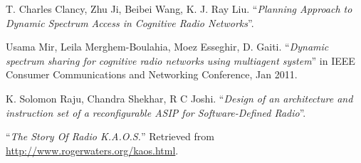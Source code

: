 \documentclass[]{scrartcl}
\begin{document}
\begin{thebibliography}{9}
T. Charles Clancy,
Zhu Ji,
Beibei Wang,
K. J. Ray Liu.
``\textit{Planning Approach to Dynamic Spectrum Access
in Cognitive Radio Networks}''.

Usama Mir,
Leila Merghem-Boulahia,
Moez Esseghir,
D. Gaiti.
``\textit{Dynamic spectrum sharing for cognitive radio networks 
using multiagent system}'' in IEEE Consumer Communications and 
Networking Conference, Jan 2011.

K. Solomon Raju, Chandra Shekhar, R C Joshi.
``\textit{Design of an architecture and instruction set of a
reconfigurable ASIP for Software-Defined Radio}''.

``\textit{The Story Of Radio K.A.O.S.}'' Retrieved from
\url{http://www.rogerwaters.org/kaos.html}.

\end{thebibliography}
\end{document}
